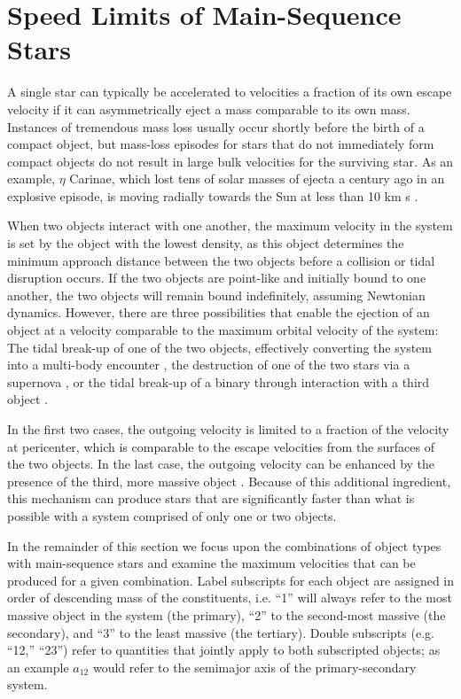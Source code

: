 \documentclass[a4paper,twocolumn]{emulateapj}
\begin{document}
\section{Speed Limits of Main-Sequence Stars}\label{sec:speedlimits}
A single star can typically be accelerated to velocities a fraction of its own escape velocity if it can asymmetrically eject a mass comparable to its own mass. Instances of tremendous mass loss usually occur shortly before the birth of a compact object, but mass-loss episodes for stars that do not immediately form compact objects do not result in large bulk velocities for the surviving star. As an example, $\eta$ Carinae, which lost tens of solar masses of ejecta a century ago in an explosive episode, is moving radially towards the Sun at less than 10 km s \citep{Smith:2004a}.

When two objects interact with one another, the maximum velocity in the system is set by the object with the lowest density, as this object determines the minimum approach distance between the two objects before a collision or tidal disruption occurs. If the two objects are point-like and initially bound to one another, the two objects will remain bound indefinitely, assuming Newtonian dynamics. However, there are three possibilities that enable the ejection of an object at a velocity comparable to the maximum orbital velocity of the system: The tidal break-up of one of the two objects, effectively converting the system into a multi-body encounter \citep{Faber:2005a,Manukian:2013a}, the destruction of one of the two stars via a supernova \citep[runaway stars,][]{Blaauw:1961a}, or the tidal break-up of a binary through interaction with a third object \citep{Hills:1988a}.

In the first two cases, the outgoing velocity is limited to a fraction of the velocity at pericenter, which is comparable to the escape velocities from the surfaces of the two objects. In the last case, the outgoing velocity can be enhanced by the presence of the third, more massive object \citep{Hills:1988a}. Because of this additional ingredient, this mechanism can produce stars that are significantly faster than what is possible with a system comprised of only one or two objects.

In the remainder of this section we focus upon the combinations of object types with main-sequence stars and examine the maximum velocities that can be produced for a given combination. Label subscripts for each object are assigned in order of descending mass of the constituents, i.e. ``1'' will always refer to the most massive object in the system (the primary), ``2'' to the second-most massive (the secondary), and ``3'' to the least massive (the tertiary). Double subscripts (e.g. ``12,'' ``23'') refer to quantities that jointly apply to both subscripted objects; as an example $a_{12}$ would refer to the semimajor axis of the primary-secondary system.
\end{document}
